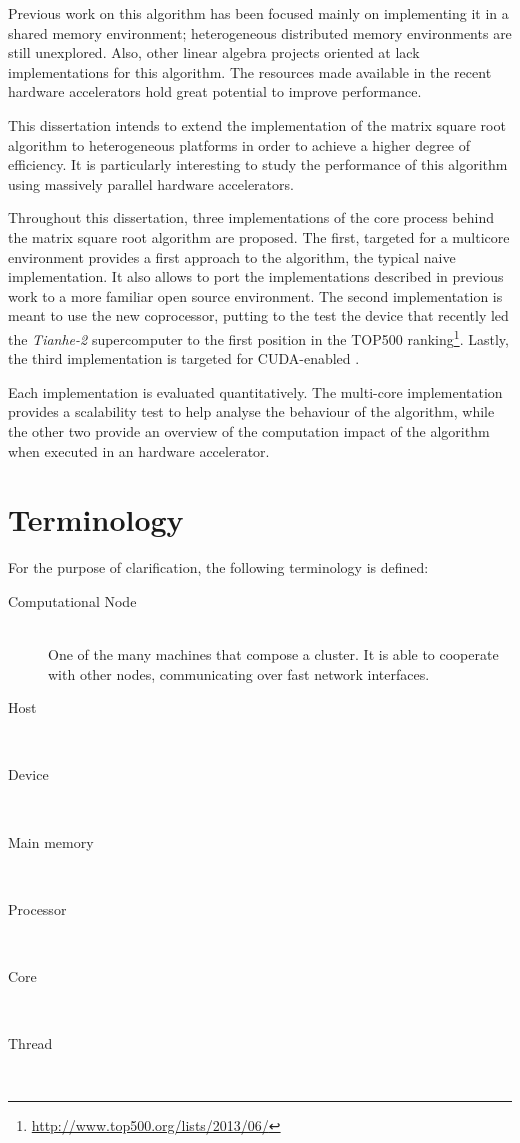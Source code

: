 \documentclass[../thesis]{subfiles}
\begin{document}
	Previous work on this algorithm has been focused mainly on implementing it in a \cpu shared memory environment; heterogeneous distributed memory environments are still unexplored. Also, other linear algebra projects oriented at \gpus lack implementations for this algorithm. The resources made available in the recent hardware accelerators hold great potential to improve performance.

	This dissertation intends to extend the implementation of the matrix square root algorithm to heterogeneous platforms in order to achieve a higher degree of efficiency. It is particularly interesting to study the performance of this algorithm using massively parallel hardware accelerators.

	Throughout this dissertation, three implementations of the core process behind the matrix square root algorithm are proposed. The first, targeted for a multicore environment provides a first approach to the algorithm, the typical naive implementation. It also allows to port the implementations described in previous work to a more familiar open source environment. The second implementation is meant to use the new \intel\xeonphi coprocessor, putting to the test the device that recently led the \textit{Tianhe-2} supercomputer to the first position in the TOP500 ranking\footnote{\url{http://www.top500.org/lists/2013/06/}}. Lastly, the third implementation is targeted for CUDA-enabled \gpus.

	Each implementation is evaluated quantitatively. The multi-core implementation provides a scalability test to help analyse the behaviour of the algorithm, while the other two provide an overview of the computation impact of the algorithm when executed in an hardware accelerator.

	\section{Terminology}
	For the purpose of clarification, the following terminology is defined:
		\begin{description}
			\item [Computational Node]\hfill\\ One of the many machines that compose a cluster. It is able to cooperate with other nodes, communicating over fast network interfaces.
			\item [Host]\hfill\\
			\item [Device]\hfill\\
			\item [Main memory]\hfill\\
			\item [Processor]\hfill\\
			\item [Core]\hfill\\
			\item [Thread]\hfill\\
		\end{description}
\end{document}
